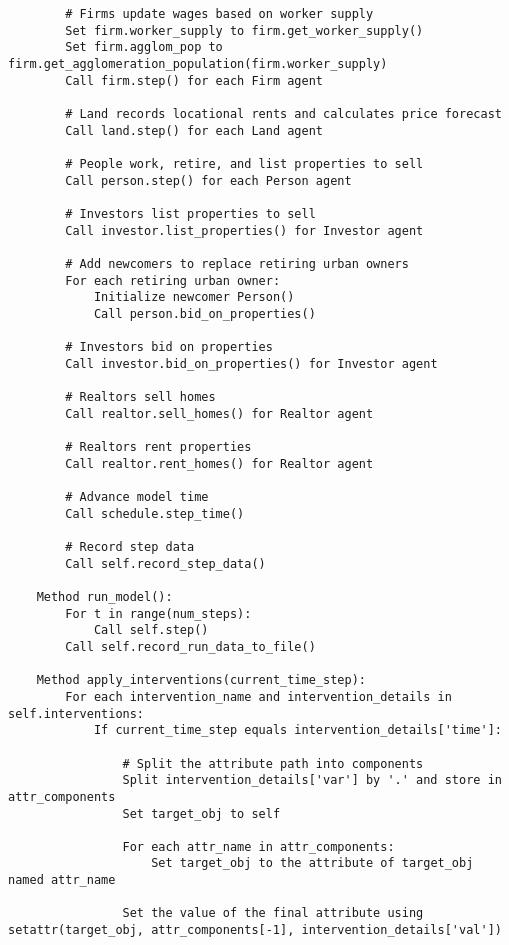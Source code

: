 {\begin{verbatim}
        # Firms update wages based on worker supply
        Set firm.worker_supply to firm.get_worker_supply()
        Set firm.agglom_pop to firm.get_agglomeration_population(firm.worker_supply)
        Call firm.step() for each Firm agent

        # Land records locational rents and calculates price forecast
        Call land.step() for each Land agent

        # People work, retire, and list properties to sell
        Call person.step() for each Person agent

        # Investors list properties to sell
        Call investor.list_properties() for Investor agent

        # Add newcomers to replace retiring urban owners
        For each retiring urban owner:
            Initialize newcomer Person()
            Call person.bid_on_properties()

        # Investors bid on properties
        Call investor.bid_on_properties() for Investor agent

        # Realtors sell homes
        Call realtor.sell_homes() for Realtor agent

        # Realtors rent properties
        Call realtor.rent_homes() for Realtor agent

        # Advance model time
        Call schedule.step_time()

        # Record step data
        Call self.record_step_data()

    Method run_model():
        For t in range(num_steps):
            Call self.step()
        Call self.record_run_data_to_file()

    Method apply_interventions(current_time_step):
        For each intervention_name and intervention_details in self.interventions:
            If current_time_step equals intervention_details['time']:
                
                # Split the attribute path into components
                Split intervention_details['var'] by '.' and store in attr_components
                Set target_obj to self
                
                For each attr_name in attr_components:
                    Set target_obj to the attribute of target_obj named attr_name

                Set the value of the final attribute using setattr(target_obj, attr_components[-1], intervention_details['val'])
    
\end{verbatim} }

